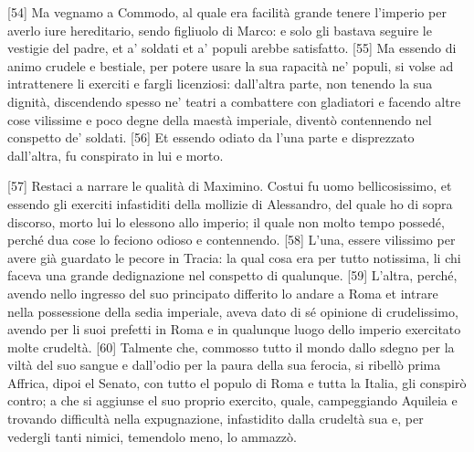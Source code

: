 {[}54{]} Ma vegnamo a Commodo, al quale era facilità grande tenere
l'imperio per averlo iure hereditario, sendo figliuolo di Marco: e solo
gli bastava seguire le vestigie del padre, et a' soldati et a' populi
arebbe satisfatto. {[}55{]} Ma essendo di animo crudele e bestiale, per
potere usare la sua rapacità ne' populi, si volse ad intrattenere li
exerciti e fargli licenziosi: dall'altra parte, non tenendo la sua
dignità, discendendo spesso ne' teatri a combattere con gladiatori e
facendo altre cose vilissime e poco degne della maestà imperiale,
diventò contennendo nel conspetto de' soldati. {[}56{]} Et essendo
odiato da l'una parte e disprezzato dall'altra, fu conspirato in lui e
morto.

{[}57{]} Restaci a narrare le qualità di Maximino. Costui fu uomo
bellicosissimo, et essendo gli exerciti infastiditi della mollizie di
Alessandro, del quale ho di sopra discorso, morto lui lo elessono allo
imperio; il quale non molto tempo possedé, perché dua cose lo feciono
odioso e contennendo. {[}58{]} L'una, essere vilissimo per avere già
guardato le pecore in Tracia: la qual cosa era per tutto notissima, li
chi faceva una grande dedignazione nel conspetto di qualunque. {[}59{]}
L'altra, perché, avendo nello ingresso del suo principato differito lo
andare a Roma et intrare nella possessione della sedia imperiale, aveva
dato di sé opinione di crudelissimo, avendo per li suoi prefetti in Roma
e in qualunque luogo dello imperio exercitato molte crudeltà. {[}60{]}
Talmente che, commosso tutto il mondo dallo sdegno per la viltà del suo
sangue e dall'odio per la paura della sua ferocia, si ribellò prima
Affrica, dipoi el Senato, con tutto el populo di Roma e tutta la Italia,
gli conspirò contro; a che si aggiunse el suo proprio exercito, quale,
campeggiando Aquileia e trovando difficultà nella expugnazione,
infastidito dalla crudeltà sua e, per vedergli tanti nimici, temendolo
meno, lo ammazzò.

